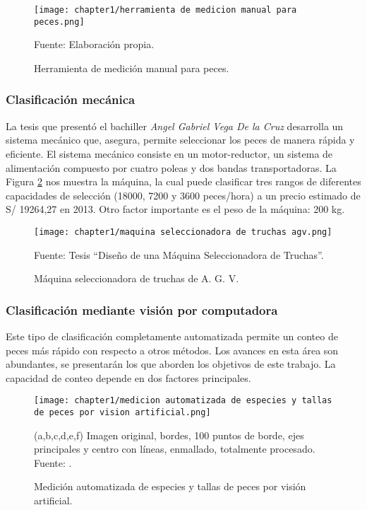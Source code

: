 \begin{figure}[H]
	\centering
	\texttt{[image: chapter1/herramienta de medicion manual para peces.png]}
	\caption{Herramienta de medición manual para peces.}
	Fuente: Elaboración propia.
	\label{fig:herramienta de medicion manual para peces}
\end{figure}

\subsubsection{Clasificación mecánica}

La tesis que presentó el bachiller \textit{Angel Gabriel Vega De la Cruz} desarrolla un sistema mecánico que, asegura, permite seleccionar los peces de manera rápida y eficiente. El sistema mecánico consiste en un motor-reductor, un sistema de alimentación compuesto por cuatro poleas y dos bandas transportadoras. La Figura \ref{fig:maquina seleccionadora de truchas agv} nos muestra la máquina, la cual puede clasificar tres rangos de  diferentes capacidades de selección (18000, 7200 y 3600 peces/hora) a un precio estimado de S/ 19264,27 en 2013. Otro factor importante es el peso de la máquina: 200 kg.\cite[p.~2,105]{Vega2013} \\

\begin{figure}[H]
	\centering
	\texttt{[image: chapter1/maquina seleccionadora de truchas agv.png]}
	\caption{Máquina seleccionadora de truchas de A. G. V.}
	Fuente: Tesis “Diseño de una Máquina Seleccionadora de Truchas”.
	\label{fig:maquina seleccionadora de truchas agv}
\end{figure}

\subsubsection{Clasificación mediante visión por computadora}

Este tipo de clasificación completamente automatizada permite un conteo de peces más rápido con respecto a otros métodos. Los avances en esta área son abundantes, se presentarán los que aborden los objetivos de este trabajo. La capacidad de conteo depende en dos factores principales. \cite[p.~2-3]{Niu2018}

\begin{figure}[H]
	\centering
	\texttt{[image: chapter1/medicion automatizada de especies y tallas de peces por vision artificial.png]}
	\caption{Medición automatizada de especies y tallas de peces por visión artificial.}
	(a,b,c,d,e,f) Imagen original, bordes, 100 puntos de borde, ejes principales y centro con líneas, enmallado, totalmente procesado.\\
	Fuente: \cite[p.~4]{White2006}.
	\label{fig:medicion automatizada de especies y tallas de peces por vision artificial}
\end{figure}

